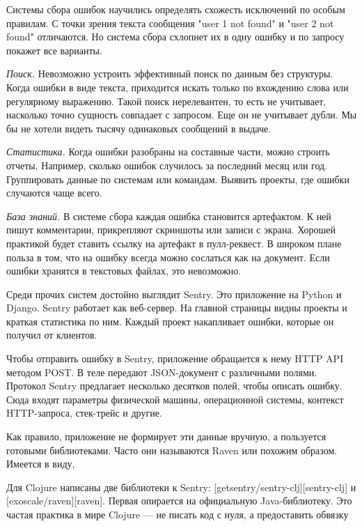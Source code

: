 Системы сбора ошибок научились определять схожесть исключений по особым
правилам. С точки зрения текста сообщения "user 1 not found" и "user 2 not
found" отличаются. Но система сбора схлопнет их в одну ошибку и по запросу
покажет все варианты.

\emph{Поиск.} Невозможно устроить эффективный поиск по данным без структуры. Когда
ошибки в виде текста, приходится искать только по вхождению слова или
регулярному выражению. Такой поиск нерелевантен, то есть не учитывает, насколько
точно сущность совпадает с запросом. Еще он не учитывает дубли. Мы бы не хотели
видеть тысячу одинаковых сообщений в выдаче.

\emph{Статистика.} Когда ошибки разобраны на составные части, можно строить
отчеты. Например, сколько ошибок случилось за последний месяц или
год. Группировать данные по системам или командам. Выявить проекты, где ошибки
случаются чаще всего.

\emph{База знаний.} В системе сбора каждая ошибка становится артефактом. К ней
пишут комментарии, прикрепляют скриншоты или записи с экрана. Хорошей практикой
будет ставить ссылку на артефакт в пулл-реквест. В широком плане польза в том,
что на ошибку всегда можно сослаться как на документ. Если ошибки хранятся в
текстовых файлах, это невозможно.

Среди прочих систем достойно выглядит Sentry. Это приложение на Python и
Django. Sentry работает как веб-сервер. На главной страницы видны проекты и
краткая статистика по ним. Каждый проект накапливает ошибки, которые он получил
от клиентов.

Чтобы отправить ошибку в Sentry, приложение обращается к нему HTTP API методом
POST. В теле передают JSON-документ с различными полями. Протокол Sentry
предлагает несколько десятков полей, чтобы описать ошибку. Сюда входят параметры
физической машины, операционной системы, контекст HTTP-запроса, стек-трейс и
другие.

Как правило, приложение не формирует эти данные вручную, а пользуется готовыми
библиотеками. Часто они называются Raven или похожим образом. Имеется в виду,


Для Clojure написаны две библиотеки к Sentry: [getsentry/sentry-clj][sentry-clj]
и [exoscale/raven][raven]. Первая опирается на официальную Java-библиотеку. Это
частая практика в мире Clojure — не писать код с нуля, а предоставить обвязку

